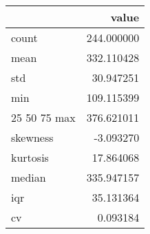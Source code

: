\begin{tabular}{lr}
\toprule
 & value \\
\midrule
count & 244.000000 \\
mean & 332.110428 \\
std & 30.947251 \\
min & 109.115399 \\
25%
50%
75%
max & 376.621011 \\
skewness & -3.093270 \\
kurtosis & 17.864068 \\
median & 335.947157 \\
iqr & 35.131364 \\
cv & 0.093184 \\
\bottomrule
\end{tabular}
